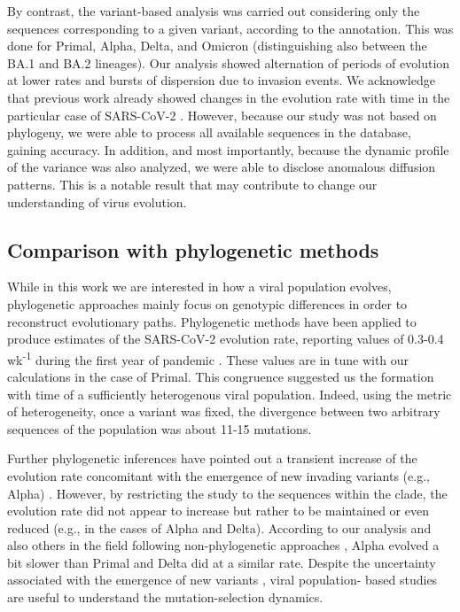 By contrast, the variant-based analysis was carried out considering only the sequences corresponding to a given variant, according to the annotation. This was done for Primal, Alpha, Delta, and Omicron (distinguishing also between the BA.1 and BA.2 lineages). Our analysis showed alternation of periods of evolution at lower rates and bursts of dispersion due to invasion events. We acknowledge that previous work already showed changes in the evolution rate with time in the particular case of SARS-CoV-2 \cite{ghafari2022, tay2022}. However, because our study was not based on phylogeny, we were able to process all available sequences in the database, gaining accuracy. In addition, and most importantly, because the dynamic profile of the variance was also analyzed, we were able to disclose anomalous diffusion patterns. This is a notable result that may contribute to change our understanding of virus evolution.

\subsection{Comparison with phylogenetic methods}

While in this work we are interested in how a viral population evolves, phylogenetic approaches mainly focus on genotypic differences in order to reconstruct evolutionary paths. Phylogenetic methods have been applied to produce estimates of the SARS-CoV-2 evolution rate, reporting values of 0.3-0.4 wk\textsuperscript{-1} during the first year of pandemic \cite{ghafari2022, wang2022}. These values are in tune with our calculations in the case of Primal. This congruence suggested us the formation with time of a sufficiently heterogenous viral population. Indeed, using the metric of heterogeneity, once a variant was fixed, the divergence between two arbitrary sequences of the population was about 11-15 mutations.

Further phylogenetic inferences have pointed out a transient increase of the evolution rate concomitant with the emergence of new invading variants (e.g., Alpha) \cite{tay2022}. However, by restricting the study to the sequences within the clade, the evolution rate did not appear to increase but rather to be maintained or even reduced (e.g., in the cases of Alpha and Delta). According to our analysis and also others in the field following non-phylogenetic approaches \cite{neher2022}, Alpha evolved a bit slower than Primal and Delta did at a similar rate. Despite the uncertainty associated with the emergence of new variants \cite{hill2022}, viral population- based studies are useful to understand the mutation-selection dynamics.

